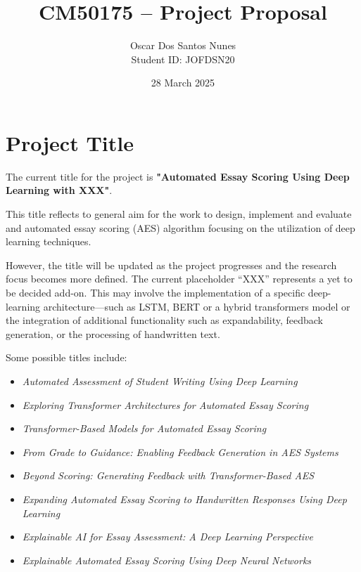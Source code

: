 \documentclass[11pt]{article}
\title{CM50175 – Project Proposal}
\author{Oscar Dos Santos Nunes \\ Student ID: JOFDSN20}
\date{28 March 2025}
\begin{document}
\maketitle

\section*{Project Title}
The current title for the project is \textbf{"Automated Essay Scoring Using Deep Learning with XXX"}.

This title reflects to general aim for the work to design, implement and evaluate and automated essay scoring (AES) 
algorithm focusing on the utilization of deep learning techniques.

However, the title will be updated as the project progresses and the research focus becomes more defined. 
The current placeholder “XXX” represents a yet to be decided add-on. 
This may involve the implementation of a specific deep-learning architecture—such as LSTM, 
BERT or a hybrid transformers model or the integration of additional functionality such as expandability, 
feedback generation, or the processing of handwritten text.

\vspace{0.5em}

Some possible titles include:
\begin{itemize}
    \item \textit{Automated Assessment of Student Writing Using Deep Learning}
    \item \textit{Exploring Transformer Architectures for Automated Essay Scoring}
    \item \textit{Transformer-Based Models for Automated Essay Scoring}
    \item \textit{From Grade to Guidance: Enabling Feedback Generation in AES Systems}
    \item \textit{Beyond Scoring: Generating Feedback with Transformer-Based AES}
    \item \textit{Expanding Automated Essay Scoring to Handwritten Responses Using Deep Learning}
    \item \textit{Explainable AI for Essay Assessment: A Deep Learning Perspective}
    \item \textit{Explainable Automated Essay Scoring Using Deep Neural Networks}
\end{itemize}
\end{document}
